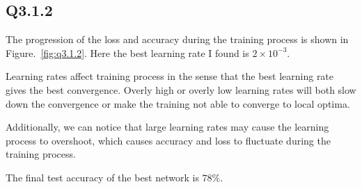 \documentclass[11pt]{article}
\begin{document}
\newpage

\subsection*{Q3.1.2}

The progression of the loss and accuracy during the training process is shown in Figure.~\ref{fig:q3.1.2}. Here the best learning rate I found is $2\times10^{-3}$.

Learning rates affect training process in the sense that the best learning rate gives the best convergence. Overly high or overly low learning rates will both slow down the convergence or make the training not able to converge to local optima.

Additionally, we can notice that large learning rates may cause the learning process to overshoot, which causes accuracy and loss to fluctuate during the training process.

The final test accuracy of the best network is $78\%$.
\end{document}
